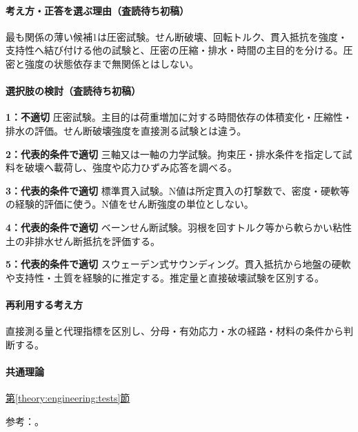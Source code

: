 \paragraph{考え方・正答を選ぶ理由（査読待ち初稿）} 最も関係の薄い候補1は圧密試験。せん断破壊、回転トルク、貫入抵抗を強度・支持性へ結び付ける他の試験と、圧密の圧縮・排水・時間の主目的を分ける。圧密と強度の状態依存まで無関係とはしない。

\paragraph{選択肢の検討（査読待ち初稿）}\mbox{}\par

\noindent\textbf{1：不適切} 圧密試験。主目的は荷重増加に対する時間依存の体積変化・圧縮性・排水の評価。せん断破壊強度を直接測る試験とは違う。\par

\noindent\textbf{2：代表的条件で適切} 三軸又は一軸の力学試験。拘束圧・排水条件を指定して試料を破壊へ載荷し、強度や応力ひずみ応答を調べる。\par

\noindent\textbf{3：代表的条件で適切} 標準貫入試験。N値は所定貫入の打撃数で、密度・硬軟等の経験的評価に使う。N値をせん断強度の単位としない。\par

\noindent\textbf{4：代表的条件で適切} ベーンせん断試験。羽根を回すトルク等から軟らかい粘性土の非排水せん断抵抗を評価する。\par

\noindent\textbf{5：代表的条件で適切} スウェーデン式サウンディング。貫入抵抗から地盤の硬軟や支持性・土質を経験的に推定する。推定量と直接破壊試験を区別する。\par

\paragraph{再利用する考え方} 直接測る量と代理指標を区別し、分母・有効応力・水の経路・材料の条件から判断する。

\paragraph{共通理論} \hyperref[theory:engineering:tests]{第\ref*{theory:engineering:tests}節}

\par 参考：\cite{eng52_geotech_tests,eng52_consolidation}。

